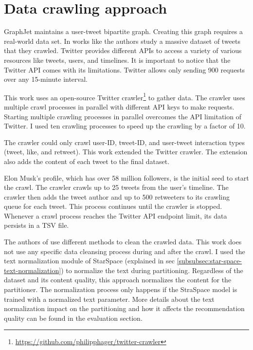 \section{Data crawling approach}
\label{sec:data-crawling-approach}

GraphJet maintains a user-tweet bipartite graph. Creating this graph requires a real-world data set. In works like \cite{kwakWhatTwitterSocial2010} the authors study a massive dataset of tweets that they crawled. Twitter provides different APIs to access a variety of various resources like tweets, users, and timelines. It is important to notice that the Twitter API comes with its limitations. Twitter allows only sending 900 requests over any 15-minute interval. 


This work uses an open-source Twitter crawler\footnote{\url{https://github.com/philipphager/twitter-crawler}} to gather data. The crawler uses multiple crawl processes in parallel with different API keys to make requests. Starting multiple crawling processes in parallel overcomes the API limitation of Twitter. I used ten crawling processes to speed up the crawling by a factor of 10. 


The crawler could only crawl user-ID, tweet-ID, and user-tweet interaction types (tweet, like, and retweet). This work extended the Twitter crawler. The extension also adds the content of each tweet to the final dataset. 


Elon Musk's profile, which has over 58 million followers, is the initial seed to start the crawl. The crawler crawls up to 25 tweets from the user's timeline. The crawler then adds the tweet author and up to 500 retweeters to its crawling queue for each tweet. This process continues until the crawler is stopped. Whenever a crawl process reaches the Twitter API endpoint limit, its data persists in a TSV file.


The authors of \cite{kwakWhatTwitterSocial2010} use different methods to clean the crawled data. This work does not use any specific data cleansing process during and after the crawl. I used the text normalization module of StarSpace (explained in sec \ref{subsubsec:star-space-text-normalization}) to normalize the text during partitioning. Regardless of the dataset and its content quality, this approach normalizes the content for the partitioner. The normalization process only happens if the StraSpace model is trained with a normalized text parameter. More details about the text normalization impact on the partitioning and how it affects the recommendation quality can be found in the evaluation section.


